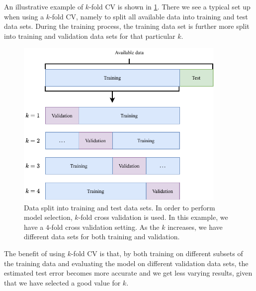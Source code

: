 An illustrative example of $k$-fold CV is shown in \cref{fig:k-fold-cv}. There we see a typical set up when using a $k$-fold CV, namely to split all available data into training and test data sets. During the training process, the training data set is further more split into training and validation data sets for that particular $k$.
\begin{figure}[H]
    \centering
    \includegraphics[width=0.9\textwidth]{thesis/figures/k-fold-cv_cropped.pdf}
    \caption{Data split into training and test data sets. In order to perform model selection, $k$-fold cross validation is used. In this example, we have a $4$-fold cross validation setting. As the $k$ increases, we have different data sets for both training and validation.}
    \label{fig:k-fold-cv}
\end{figure}

The benefit of using $k$-fold CV is that, by both training on different subsets of the training data and evaluating the model on different validation data sets, the estimated test error becomes more accurate and we get less varying results, given that we have selected a good value for $k$.